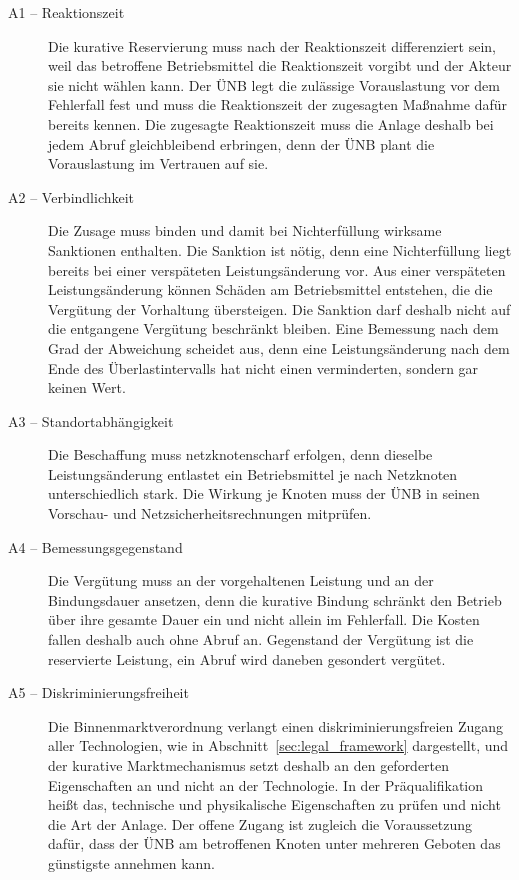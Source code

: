 \begin{description}
    \item[A1 -- Reaktionszeit] Die kurative Reservierung muss nach der Reaktionszeit differenziert sein, weil das betroffene Betriebsmittel die Reaktionszeit vorgibt und der Akteur sie nicht wählen kann.
    Der \ac{ÜNB} legt die zulässige Vorauslastung vor dem Fehlerfall fest und muss die Reaktionszeit der zugesagten Maßnahme dafür bereits kennen.
    Die zugesagte Reaktionszeit muss die Anlage deshalb bei jedem Abruf gleichbleibend erbringen, denn der \ac{ÜNB} plant die Vorauslastung im Vertrauen auf sie.
    \item[A2 -- Verbindlichkeit] Die Zusage muss binden und damit bei Nichterfüllung wirksame Sanktionen enthalten.
    Die Sanktion ist nötig, denn eine Nichterfüllung liegt bereits bei einer verspäteten Leistungsänderung vor.
    Aus einer verspäteten Leistungsänderung können Schäden am Betriebsmittel entstehen, die die Vergütung der Vorhaltung übersteigen.
    Die Sanktion darf deshalb nicht auf die entgangene Vergütung beschränkt bleiben.
    Eine Bemessung nach dem Grad der Abweichung scheidet aus, denn eine Leistungsänderung nach dem Ende des Überlastintervalls hat nicht einen verminderten, sondern gar keinen Wert.
    \item[A3 -- Standortabhängigkeit] Die Beschaffung muss netzknotenscharf erfolgen, denn dieselbe Leistungsänderung entlastet ein Betriebsmittel je nach Netzknoten unterschiedlich stark.
    Die Wirkung je Knoten muss der \ac{ÜNB} in seinen Vorschau- und Netzsicherheitsrechnungen mitprüfen.
    \item[A4 -- Bemessungsgegenstand] Die Vergütung muss an der vorgehaltenen Leistung und an der Bindungsdauer ansetzen, denn die kurative Bindung schränkt den Betrieb über ihre gesamte Dauer ein und nicht allein im Fehlerfall.
    Die Kosten fallen deshalb auch ohne Abruf an.
    Gegenstand der Vergütung ist die reservierte Leistung, ein Abruf wird daneben gesondert vergütet.
    \item[A5 -- Diskriminierungsfreiheit] Die Binnenmarktverordnung verlangt einen diskriminierungsfreien Zugang aller Technologien, wie in Abschnitt~\ref{sec:legal_framework} dargestellt, und der kurative Marktmechanismus setzt deshalb an den geforderten Eigenschaften an und nicht an der Technologie.
    In der Präqualifikation heißt das, technische und physikalische Eigenschaften zu prüfen und nicht die Art der Anlage.
    Der offene Zugang ist zugleich die Voraussetzung dafür, dass der \ac{ÜNB} am betroffenen Knoten unter mehreren Geboten das günstigste annehmen kann.

\end{description}
